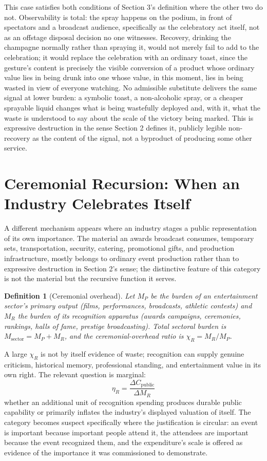 \documentclass[11pt]{article}
\newtheorem{definition}{Definition}[section]
\begin{document}
This case satisfies both conditions of Section 3's definition where the other two do not. Observability is total: the spray happens on the podium, in front of spectators and a broadcast audience, specifically as the celebratory act itself, not as an offstage disposal decision no one witnesses. Recovery, drinking the champagne normally rather than spraying it, would not merely fail to add to the celebration; it would replace the celebration with an ordinary toast, since the gesture's content is precisely the visible conversion of a product whose ordinary value lies in being drunk into one whose value, in this moment, lies in being wasted in view of everyone watching. No admissible substitute delivers the same signal at lower burden: a symbolic toast, a non-alcoholic spray, or a cheaper sprayable liquid changes what is being wastefully deployed and, with it, what the waste is understood to say about the scale of the victory being marked. This is expressive destruction in the sense Section 2 defines it, publicly legible non-recovery as the content of the signal, not a byproduct of producing some other service.

\section{Ceremonial Recursion: When an Industry Celebrates Itself}

A different mechanism appears where an industry stages a public representation of its own importance. The material an awards broadcast consumes, temporary sets, transportation, security, catering, promotional gifts, and production infrastructure, mostly belongs to ordinary event production rather than to expressive destruction in Section 2's sense; the distinctive feature of this category is not the material but the recursive function it serves.

\begin{definition}[Ceremonial overhead]
Let $M_P$ be the burden of an entertainment sector's primary output (films, performances, broadcasts, athletic contests) and $M_R$ the burden of its recognition apparatus (awards campaigns, ceremonies, rankings, halls of fame, prestige broadcasting). Total sectoral burden is $M_{\text{sector}} = M_P + M_R$, and the ceremonial-overhead ratio is $\chi_R = M_R / M_P$.
\end{definition}

A large $\chi_R$ is not by itself evidence of waste; recognition can supply genuine criticism, historical memory, professional standing, and entertainment value in its own right. The relevant question is marginal:
\[
\eta_R = \frac{\Delta C_{\text{public}}}{\Delta M_R}
\]
whether an additional unit of recognition spending produces durable public capability or primarily inflates the industry's displayed valuation of itself. The category becomes suspect specifically where the justification is circular: an event is important because important people attend it, the attendees are important because the event recognized them, and the expenditure's scale is offered as evidence of the importance it was commissioned to demonstrate.
\end{document}

